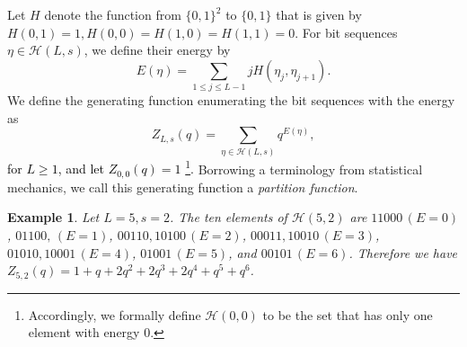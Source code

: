 \documentclass[sn-mathphys-num]{sn-jnl}%
\newcommand{\red}[1]{\textcolor{black}{#1}}
\theoremstyle{thmstyleone}%
\theoremstyle{thmstyletwo}%
\newtheorem{example}{Example}%
\theoremstyle{thmstylethree}%
\begin{document}
Let $H$ denote the function from $ \{0,1\}^2$ to $\{0,1\}$ that is given by
$H(0,1)=1, H(0,0)=H(1,0)=H(1,1)=0$.
For bit sequences $\eta \in \mathcal{H} (L,s)$, we define their energy by
\begin{equation}\label{eq:2024july3_9} 
E(\eta) = \sum_{1 \leq j \leq L-1} j H(\eta_j, \eta_{j+1}).
\end{equation}
We define the generating function enumerating
the bit sequences with the energy as
\begin{equation}
Z_{L,s}(q) =
\sum_{\eta \in \mathcal{H} (L,s)} q^{E(\eta)},
\end{equation}
\red{for $L \geq 1$, and let $Z_{0,0}(q) =1$ \footnote{Accordingly, we formally define 
$\mathcal{H} (0,0)$ to be the set 
that has only one element with energy $0$.}.}
Borrowing a terminology from statistical mechanics, we
call this generating function a {\em partition function}.

\begin{example}
Let $L=5,s=2$.
The ten elements of $\mathcal{H} (5,2)$ are 
$11000 \, (E=0)$, $01100, \, (E=1)$, $00110, 10100 \, (E=2)$, 
$00011, 10010 \, (E=3)$, $01010, 10001 \, (E=4)$,
$01001 \, (E=5)$, and $00101 \, (E=6)$.  
Therefore we have $Z_{5,2}(q) =1 + q + 2q^2+2q^3+2q^4+ q^5+q^6$.
\end{example}
\end{document}
